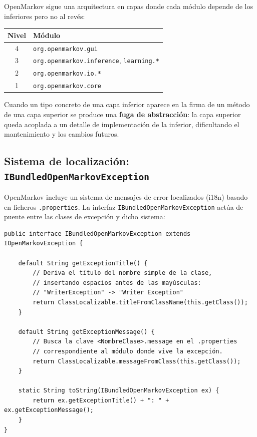 \documentclass[12pt,a4paper]{article}
\begin{document}
OpenMarkov sigue una arquitectura en capas donde cada módulo depende de los
inferiores pero no al revés:

\begin{center}
\begin{tabular}{cl}
\toprule
Nivel & Módulo \\
\midrule
4 & \texttt{org.openmarkov.gui} \\
3 & \texttt{org.openmarkov.inference}, \texttt{learning.*} \\
2 & \texttt{org.openmarkov.io.*} \\
1 & \texttt{org.openmarkov.core} \\
\bottomrule
\end{tabular}
\end{center}

Cuando un tipo concreto de una capa inferior aparece en la firma de un método de
una capa superior se produce una \textbf{fuga de abstracción}: la capa superior
queda acoplada a un detalle de implementación de la inferior, dificultando el
mantenimiento y los cambios futuros.

\subsection{Sistema de localización: \texttt{IBundledOpenMarkovException}}
\label{sec:i18n}

OpenMarkov incluye un sistema de mensajes de error localizados (i18n) basado en
ficheros \texttt{.properties}. La interfaz \texttt{IBundledOpenMarkovException}
actúa de puente entre las clases de excepción y dicho sistema:

\begin{lstlisting}[caption={Interfaz de localización de excepciones (extracto)}]
public interface IBundledOpenMarkovException extends IOpenMarkovException {

    default String getExceptionTitle() {
        // Deriva el título del nombre simple de la clase,
        // insertando espacios antes de las mayúsculas:
        // "WriterException" -> "Writer Exception"
        return ClassLocalizable.titleFromClassName(this.getClass());
    }

    default String getExceptionMessage() {
        // Busca la clave <NombreClase>.message en el .properties
        // correspondiente al módulo donde vive la excepción.
        return ClassLocalizable.messageFromClass(this.getClass());
    }

    static String toString(IBundledOpenMarkovException ex) {
        return ex.getExceptionTitle() + ": " + ex.getExceptionMessage();
    }
}
\end{lstlisting}
\end{document}
